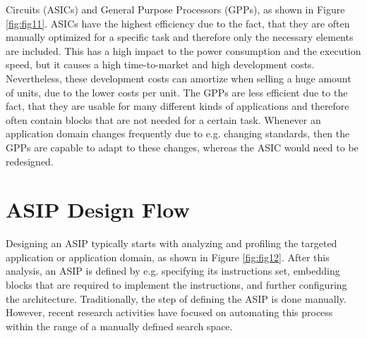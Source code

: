Circuits (ASICs) and General Purpose Processors (GPPs), as shown in Figure
\ref{fig:fig11}. ASICs have the highest efficiency
due to the fact, that they are often manually optimized for a specific
task and therefore only the necessary elements are included. This has a
high impact to the power consumption and the execution speed, but it
causes a high time-to-market and high development costs. Nevertheless,
these development costs can amortize when selling a huge amount of
units, due to the lower costs per unit. The GPPs are less efficient due
to the fact, that they are usable for many different kinds of
applications and therefore often contain blocks that are not needed for
a certain task. Whenever an application domain changes frequently due to
e.g. changing standards, then the GPPs are capable to adapt to these
changes, whereas the ASIC would need to be redesigned.
\hypertarget{asip-design-flow}{%
\section{ASIP Design Flow}\label{asip-design-flow}}
Designing an ASIP typically starts with analyzing and profiling the
targeted application or application domain, as shown in Figure
\ref{fig:fig12}. After this analysis, an ASIP is
defined by e.g. specifying its instructions set, embedding blocks that
are required to implement the instructions, and further configuring the
architecture. Traditionally, the step of defining the ASIP is done
manually. However, recent research activities have focused on automating
this process within the range of a manually defined search space.


